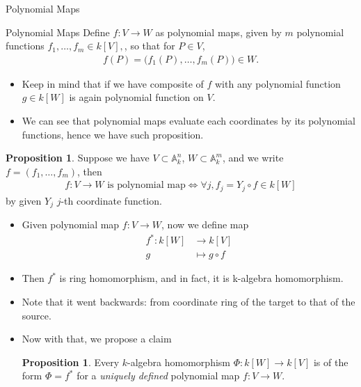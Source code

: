 \documentclass[8pt]{beamer}
\newcommand{\A}{\mathbb{A}}
\theoremstyle{definition}
\newtheorem{proposition}[theorem]{Proposition}
\begin{document}
    \begin{frame}{Polynomial Maps}
        \begin{definition}{Polynomial Maps}
            Define $f \colon V \to W$ as polynomial maps, given by $m$ polynomial functions $f_1, \dots, f_m \in k[V],$, so that for $P \in V$,
            \begin{align*}
                f(P) = \bigl(f_1(P), \dots, f_m(P)\bigr) \in W.
            \end{align*}
        \end{definition}

        \begin{itemize}
            \item Keep in mind that if we have composite of $f$  with any polynomial function $g \in k[W]$ is again polynomial function on $V$. 
            \item We can see that polynomial maps evaluate each coordinates by its polynomial functions, hence we have such proposition.
        \end{itemize}

        \begin{proposition}
            Suppose we have $V \subset \A^n_k$, $W \subset \A^m_k$, and we write  $f = (f_1, \ldots, f_m)$, then 
            \begin{align*}
                f: V \to W \text{ is polynomial map} \iff \forall j, f_j = Y_j \circ f \in k[W] 
            \end{align*}
            by given $Y_j$ $j$-th coordinate function.
        \end{proposition}
        
    \end{frame}


    \begin{frame}
        \begin{itemize}
            \item Given polynomial map $f: V \to W$, now we define map 
                \begin{align*}
                    f^* : k[W] &\to k[V] \\
                    g &\mapsto g \circ f
                \end{align*}
            \item Then $f^*$ is ring homomorphism, and in fact, it is k-algebra homomorphism.
            \item Note that it went backwards: from coordinate ring of the target to that of the source.
            \item Now with that, we propose a claim 
            \begin{proposition}
                Every $k$-algebra homomorphism $\Phi \colon k[W] \to k[V]$ is of the form $\Phi = f^*$ for a \emph{uniquely defined} polynomial map $f \colon V \to W$.
            \end{proposition}
        \end{itemize}

        
        
    \end{frame}
\end{document}

